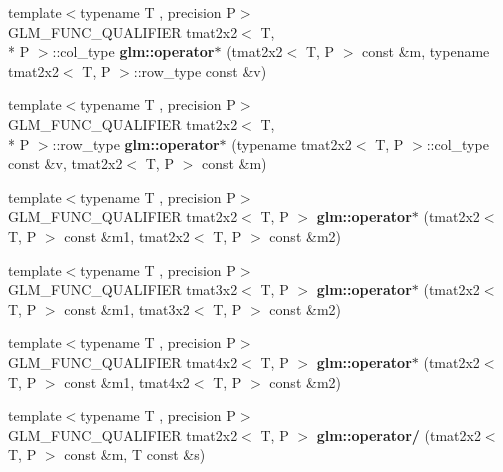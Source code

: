\begin{DoxyCompactItemize}
\item 
\hypertarget{namespaceglm_a65dc9a4505d414c9c07286a793588031}{{\footnotesize template$<$typename T , precision P$>$ }\\G\-L\-M\-\_\-\-F\-U\-N\-C\-\_\-\-Q\-U\-A\-L\-I\-F\-I\-E\-R tmat2x2$<$ T, \\*
P $>$\-::col\-\_\-type {\bfseries glm\-::operator$\ast$} (tmat2x2$<$ T, P $>$ const \&m, typename tmat2x2$<$ T, P $>$\-::row\-\_\-type const \&v)}\label{namespaceglm_a65dc9a4505d414c9c07286a793588031}

\item 
\hypertarget{namespaceglm_ac6036e820bc048e15196afeac0defde7}{{\footnotesize template$<$typename T , precision P$>$ }\\G\-L\-M\-\_\-\-F\-U\-N\-C\-\_\-\-Q\-U\-A\-L\-I\-F\-I\-E\-R tmat2x2$<$ T, \\*
P $>$\-::row\-\_\-type {\bfseries glm\-::operator$\ast$} (typename tmat2x2$<$ T, P $>$\-::col\-\_\-type const \&v, tmat2x2$<$ T, P $>$ const \&m)}\label{namespaceglm_ac6036e820bc048e15196afeac0defde7}

\item 
\hypertarget{namespaceglm_a6490257bcf679a71b20a7e82ebe54188}{{\footnotesize template$<$typename T , precision P$>$ }\\G\-L\-M\-\_\-\-F\-U\-N\-C\-\_\-\-Q\-U\-A\-L\-I\-F\-I\-E\-R tmat2x2$<$ T, P $>$ {\bfseries glm\-::operator$\ast$} (tmat2x2$<$ T, P $>$ const \&m1, tmat2x2$<$ T, P $>$ const \&m2)}\label{namespaceglm_a6490257bcf679a71b20a7e82ebe54188}

\item 
\hypertarget{namespaceglm_a4d95e330a465ca1f581ca2580730bfa3}{{\footnotesize template$<$typename T , precision P$>$ }\\G\-L\-M\-\_\-\-F\-U\-N\-C\-\_\-\-Q\-U\-A\-L\-I\-F\-I\-E\-R tmat3x2$<$ T, P $>$ {\bfseries glm\-::operator$\ast$} (tmat2x2$<$ T, P $>$ const \&m1, tmat3x2$<$ T, P $>$ const \&m2)}\label{namespaceglm_a4d95e330a465ca1f581ca2580730bfa3}

\item 
\hypertarget{namespaceglm_af72b94d4ec87222f66a42ae7bd2cb4b7}{{\footnotesize template$<$typename T , precision P$>$ }\\G\-L\-M\-\_\-\-F\-U\-N\-C\-\_\-\-Q\-U\-A\-L\-I\-F\-I\-E\-R tmat4x2$<$ T, P $>$ {\bfseries glm\-::operator$\ast$} (tmat2x2$<$ T, P $>$ const \&m1, tmat4x2$<$ T, P $>$ const \&m2)}\label{namespaceglm_af72b94d4ec87222f66a42ae7bd2cb4b7}

\item 
\hypertarget{namespaceglm_a87f87c14e8af120d95833cba2543c78d}{{\footnotesize template$<$typename T , precision P$>$ }\\G\-L\-M\-\_\-\-F\-U\-N\-C\-\_\-\-Q\-U\-A\-L\-I\-F\-I\-E\-R tmat2x2$<$ T, P $>$ {\bfseries glm\-::operator/} (tmat2x2$<$ T, P $>$ const \&m, T const \&s)}\label{namespaceglm_a87f87c14e8af120d95833cba2543c78d}


\end{DoxyCompactItemize}

